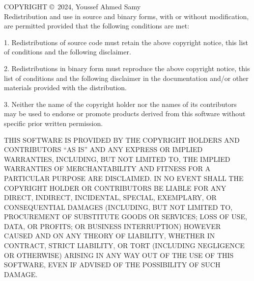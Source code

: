 \documentclass[a4paper,11pt]{article}
\theoremstyle{mytheor}
\theoremstyle{mytheor}
\begin{document}
COPYRIGHT \copyright \ 2024, Youssef Ahmed Samy\\
Redistribution and use in source and binary forms, with or without modification, are permitted provided that the following conditions are met:

1. Redistributions of source code must retain the above copyright notice, this list of conditions and the following disclaimer.

2. Redistributions in binary form must reproduce the above copyright notice, this list of conditions and the following disclaimer in the documentation and/or other materials provided with the distribution.

3. Neither the name of the copyright holder nor the names of its contributors may be used to endorse or promote products derived from this software without specific prior written permission.

THIS SOFTWARE IS PROVIDED BY THE COPYRIGHT HOLDERS AND CONTRIBUTORS “AS IS” AND ANY EXPRESS OR IMPLIED WARRANTIES, INCLUDING, BUT NOT LIMITED TO, THE IMPLIED WARRANTIES OF MERCHANTABILITY AND FITNESS FOR A PARTICULAR PURPOSE ARE DISCLAIMED. IN NO EVENT SHALL THE COPYRIGHT HOLDER OR CONTRIBUTORS BE LIABLE FOR ANY DIRECT, INDIRECT, INCIDENTAL, SPECIAL, EXEMPLARY, OR CONSEQUENTIAL DAMAGES (INCLUDING, BUT NOT LIMITED TO, PROCUREMENT OF SUBSTITUTE GOODS OR SERVICES; LOSS OF USE, DATA, OR PROFITS; OR BUSINESS INTERRUPTION) HOWEVER CAUSED AND ON ANY THEORY OF LIABILITY, WHETHER IN CONTRACT, STRICT LIABILITY, OR TORT (INCLUDING NEGLIGENCE OR OTHERWISE) ARISING IN ANY WAY OUT OF THE USE OF THIS SOFTWARE, EVEN IF ADVISED OF THE POSSIBILITY OF SUCH DAMAGE.
{
   \fancyhf{}
}
\thispagestyle{lastpage}
\end{document}
